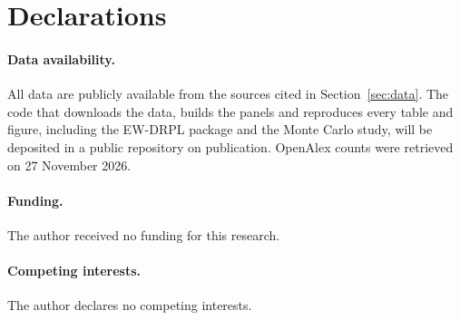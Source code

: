 \section*{Declarations}

\paragraph{Data availability.} All data are publicly available from the sources cited in
Section~\ref{sec:data}. The code that downloads the data, builds the panels and reproduces every
table and figure, including the EW-DRPL package and the Monte Carlo study, will be deposited in a
public repository on publication. OpenAlex counts were retrieved on 27 November 2026.

\paragraph{Funding.} The author received no funding for this research.

\paragraph{Competing interests.} The author declares no competing interests.
